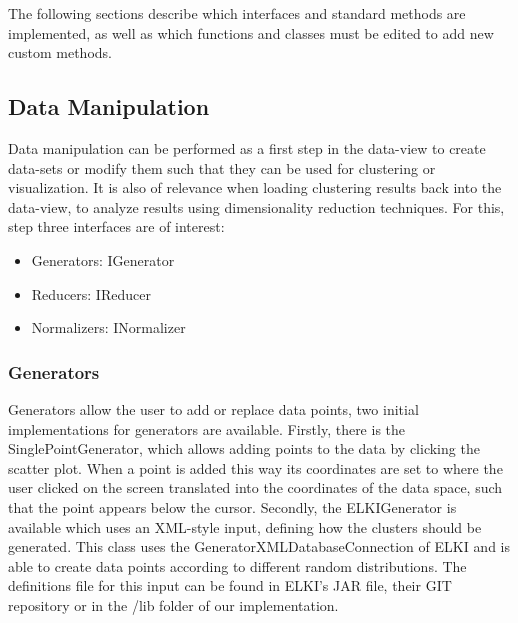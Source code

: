 \documentclass[
	a4paper,
	english,
	twoside,
	openright,               
	11pt                            
	]{report}
\begin{document}
The following sections describe which interfaces and standard methods are implemented, as well as which functions and classes must be edited to add new custom methods.

\subsection{Data Manipulation}

Data manipulation can be performed as a first step in the data-view to create data-sets or modify them such that they can be used for clustering or visualization. It is also of relevance when loading clustering results back into the data-view, to analyze results using dimensionality reduction techniques. For this, step three interfaces are of interest:

\begin{itemize}
  \item Generators: IGenerator
  \item Reducers: IReducer
  \item Normalizers: INormalizer
\end{itemize}

\subsubsection{Generators}
Generators allow the user to add or replace data points, two initial implementations for generators are available. Firstly, there is the SinglePointGenerator, which allows adding points to the data by clicking the scatter plot. When a point is added this way its coordinates are set to where the user clicked on the screen translated into the coordinates of the data space, such that the point appears below the cursor. Secondly, the ELKIGenerator is available which uses an XML-style input, defining how the clusters should be generated. This class uses the GeneratorXMLDatabaseConnection of ELKI \cite{10.1007/978-3-540-69497-7_41} and is able to create data points according to different random distributions. The definitions file for this input can be found in ELKI's JAR file, their GIT repository \cite{elkixml} or in the /lib folder of our implementation.
\end{document}
